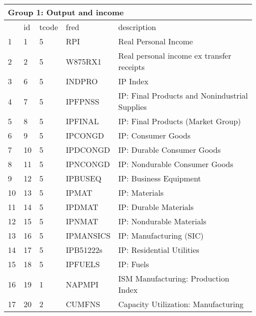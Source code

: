 \begin{table}[ht] 
\centering 
\begin{tabular}{lllll} 
\multicolumn{5}{l}{Group 1: Output and income} \\
\toprule
 & id & tcode & fred & description \\
\midrule
1 & 1 & 5 & RPI & Real Personal Income \\
2 & 2 & 5 & W875RX1 & Real personal income ex transfer receipts \\
3 & 6 & 5 & INDPRO & IP Index \\
4 & 7 & 5 & IPFPNSS & IP: Final Products and Nonindustrial Supplies \\
5 & 8 & 5 & IPFINAL & IP: Final Products (Market Group) \\
6 & 9 & 5 & IPCONGD & IP: Consumer Goods \\
7 & 10 & 5 & IPDCONGD & IP: Durable Consumer Goods \\
8 & 11 & 5 & IPNCONGD & IP: Nondurable Consumer Goods \\
9 & 12 & 5 & IPBUSEQ & IP: Business Equipment \\
10 & 13 & 5 & IPMAT & IP: Materials \\
11 & 14 & 5 & IPDMAT & IP: Durable Materials \\
12 & 15 & 5 & IPNMAT & IP: Nondurable Materials \\
13 & 16 & 5 & IPMANSICS & IP: Manufacturing (SIC) \\
14 & 17 & 5 & IPB51222s & IP: Residential Utilities \\
15 & 18 & 5 & IPFUELS & IP: Fuels \\
\rowcolor{gray} 16 & 19 & 1 & NAPMPI & ISM Manufacturing: Production Index \\
17 & 20 & 2 & CUMFNS & Capacity Utilization: Manufacturing \\
\bottomrule
\end{tabular}  
\end{table} 